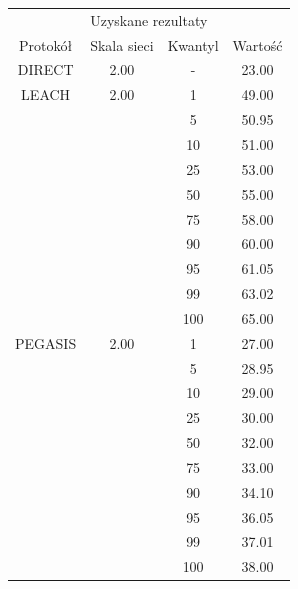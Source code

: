 \documentclass[a4paper,12pt,twoside,openany]{report}
\begin{document}
\begin{longtable}{*{4}{c}}
\toprule
\multicolumn{4}{c}{Uzyskane rezultaty} \\
Protokół	& Skala sieci	& Kwantyl	& Wartość \\
\midrule
\endhead
DIRECT	& 2.00 	& -	& 23.00 \\*
\midrule
LEACH	& 2.00	& 1	& 49.00 \\*	
	&	& 5	& 50.95 \\*
	&	& 10	& 51.00 \\*
	&	& 25	& 53.00 \\*
	&	& 50	& 55.00 \\*
	&	& 75	& 58.00 \\*
	&	& 90	& 60.00 \\*
	&	& 95	& 61.05 \\*
	&	& 99	& 63.02 \\*
	&	& 100	& 65.00 \\*
\midrule
PEGASIS	& 2.00	& 1	& 27.00 \\*
	&	& 5	& 28.95 \\*
	&	& 10	& 29.00 \\*
	&	& 25	& 30.00 \\*
	&	& 50	& 32.00 \\*
	&	& 75	& 33.00 \\*
	&	& 90	& 34.10 \\*
	&	& 95	& 36.05 \\*
	&	& 99	& 37.01 \\*
	&	& 100	& 38.00 \\*
\bottomrule
\end{longtable}
\end{document}
